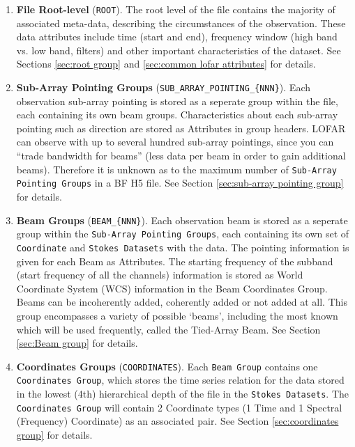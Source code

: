 \documentclass[a4paper,10pt,bibtotoc]{scrartcl}
\begin{document}
\begin{enumerate} \parskip 0pt
\item \textbf{File Root-level} (\verb|ROOT|). The root level of the
  file contains the majority of associated meta-data, describing the
  circumstances of the observation. These data attributes include time
  (start and end), frequency window (high band vs. low band, filters)
  and other important characteristics of the dataset. See Sections
  \ref{sec:root group} and \ref{sec:common lofar attributes} for details.
  
\item \textbf{Sub-Array Pointing Groups}
  (\verb|SUB_ARRAY_POINTING_{NNN}|). Each observation sub-array
  pointing is stored as a seperate group within the file, each
  containing its own beam groups. Characteristics about each sub-array
  pointing such as direction are stored as Attributes in group
  headers.  LOFAR can observe with up to several hundred sub-array pointings,
  since you can ``trade bandwidth for beams'' (less data per beam in
  order to gain additional beams). Therefore it is unknown as to the
  maximum number of \texttt{Sub-Array Pointing Groups} in a BF H5
  file.  See Section \ref{sec:sub-array pointing group} for details.

\item \textbf{Beam Groups} (\verb|BEAM_{NNN}|). Each observation beam is stored as a
  seperate group within the \texttt{Sub-Array Pointing Groups}, each
  containing its own set of \texttt{Coordinate} and \texttt{Stokes
    Datasets} with the data.  The pointing information is given for each
  Beam as Attributes.  The starting frequency of the subband (start
  frequency of all the channels) information is stored as World
  Coordinate System (WCS) information in the Beam Coordinates Group.  Beams
  can be incoherently added, coherently added or not added at all.
  This group encompasses a variety of possible `beams', including the
  most known which will be used frequently, called the Tied-Array Beam.
  See Section \ref{sec:Beam group} for details.

\item \textbf{Coordinates Groups} (\verb|COORDINATES|).  Each \texttt{Beam Group} contains
  one \texttt{Coordinates Group}, which stores the time series
  relation for the data stored in the lowest (4th) hierarchical depth
  of the file in the \texttt{Stokes Datasets}.  The \texttt{Coordinates
    Group} will contain 2 Coordinate types (1 Time and 1
  Spectral (Frequency) Coordinate) as an associated pair.  See Section
  \ref{sec:coordinates group} for details.


\end{enumerate}
\end{document}
